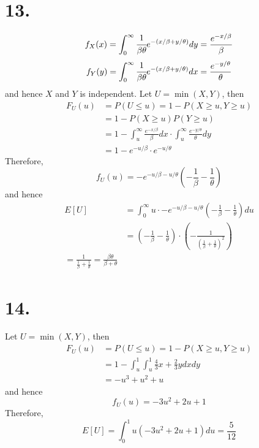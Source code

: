 \documentclass[11pt]{article}
\begin{document}
\section*{13.}
\[
    f_X(x) = \int_0^\infty \cfrac{1}{\beta \theta} e^{-\left(x/\beta +y/\theta\right)} dy = \frac{e^{-x/\beta}}{\beta}
\]
\[
    f_Y(y) = \int_0^\infty \cfrac{1}{\beta \theta} e^{-\left(x/\beta +y/\theta\right)} dx = \frac{e^{-y/\theta}}{\theta}
\]
and hence $X$ and $Y$ is independent.
Let $U = \min(X,Y)$, then
\begin{equation*}
    \begin{aligned}
        F_U(u) &= P(U\le u) = 1- P(X\ge u, Y \ge u) \\
        &= 1- P(X\ge u)P(Y\ge u) \\
        &= 1- \int_u^\infty \frac{e^{-x/\beta}}{\beta} dx \cdot \int_u^\infty \frac{e^{-y/\theta}}{\theta} dy  \\
        &= 1 - e^{-u/\beta} \cdot  e^{-u/\theta}
    \end{aligned}
\end{equation*}
Therefore, 
\[
    f_U(u) = -e^{-u/\beta-u/\theta}\left(-\frac{1}{\beta}-\frac{1}{\theta}\right)
\]
and hence
\begin{equation*}
    \begin{aligned}
        E[U] &= \int_0^\infty u \cdot -e^{-u/\beta-u/\theta}\left(-\frac{1}{\beta}-\frac{1}{\theta}\right) du \\
        &= \left(-\frac{1}{\beta}- \frac{1}{\theta}\right) \cdot \left(-\frac{1}{\left(\frac{1}{\beta} + \frac{1}{\theta}\right)^2} \right) \\ 
        = \frac{1}{\frac{1}{\beta} + \frac{1}{\theta}} = \frac{\beta \theta}{\beta + \theta}
    \end{aligned}
\end{equation*}
\pagebreak
\section*{14.}
Let $U = \min(X,Y)$, then
\begin{equation*}
    \begin{aligned}
        F_U(u) &= P(U\le u) = 1- P(X\ge u, Y\ge u) \\ 
        &= 1 - \int_u^1 \int_u^1 \frac{4}{3}x + \frac{2}{3}y dxdy \\
        &=  -u^3+u^2+u
    \end{aligned}
\end{equation*}
and hence
\[
    f_U(u) = -3u^2 + 2u + 1 
\]
Therefore, 
\[
    E[U] = \int_0^1 u(-3u^2+2u+1) du = \frac{5}{12} 
\]
\pagebreak
\end{document}
